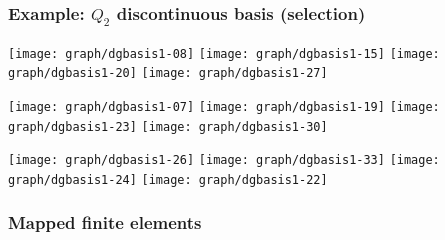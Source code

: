 \documentclass[american,ignorenonframetext,notheorems,aspectratio=1610]{beamer}
\begin{document}
\begin{frame}
  \frametitle{Example: $Q_2$ discontinuous basis (selection)}
  \begin{center}
    \texttt{[image: graph/dgbasis1-08]}
    \texttt{[image: graph/dgbasis1-15]}
    \texttt{[image: graph/dgbasis1-20]}
    \texttt{[image: graph/dgbasis1-27]}

    \texttt{[image: graph/dgbasis1-07]}
    \texttt{[image: graph/dgbasis1-19]}
    \texttt{[image: graph/dgbasis1-23]}
    \texttt{[image: graph/dgbasis1-30]}

    \texttt{[image: graph/dgbasis1-26]}
    \texttt{[image: graph/dgbasis1-33]}
    \texttt{[image: graph/dgbasis1-24]}
    \texttt{[image: graph/dgbasis1-22]}
  \end{center}
\end{frame}

\subsubsection{Mapped finite elements}

\frame {}
\frame {}
\frame {}
\frame {}
\frame {}
\frame {}
\frame {}
\frame {}



\end{document}
